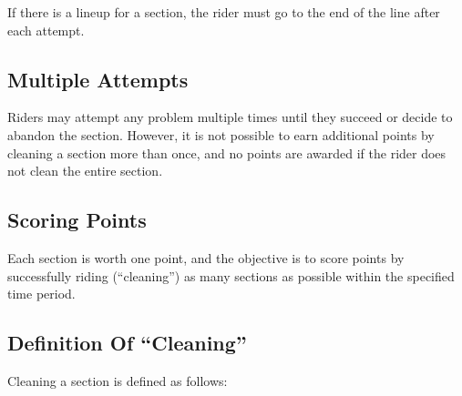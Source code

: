 If there is a lineup for a section, the rider must go to the end of the line after each attempt.

\subsection{Multiple Attempts}
Riders may attempt any problem multiple times until they succeed or decide to abandon the section.
However, it is not possible to earn additional points by cleaning a section more than once, and no points are awarded if the rider does not clean the entire section.

\subsection{Scoring Points}
Each section is worth one point, and the objective is to score points by successfully riding (``cleaning'') as many sections as possible within the specified time period.

\subsection{Definition Of ``Cleaning''}
Cleaning a section is defined as follows:

